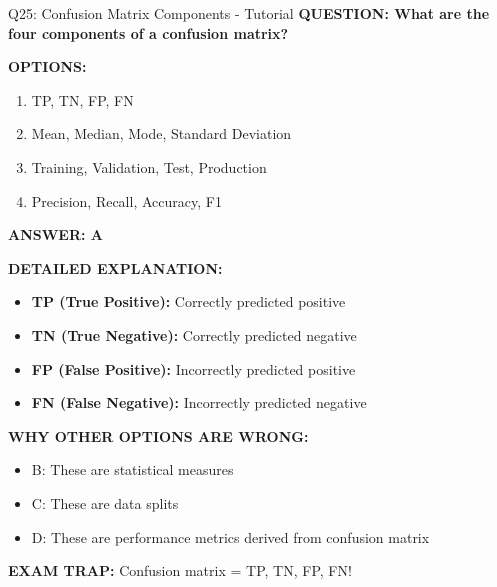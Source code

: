 \documentclass[8pt]{beamer}
\begin{document}
	\begin{frame}{Q25: Confusion Matrix Components - Tutorial}
		\fontsize{6.5}{7.5}\selectfont
		\textbf{QUESTION: What are the four components of a confusion matrix?}
		
		\vspace{0.1cm}
		\textbf{OPTIONS:}
		\begin{enumerate}
			\item TP, TN, FP, FN
			\item Mean, Median, Mode, Standard Deviation
			\item Training, Validation, Test, Production
			\item Precision, Recall, Accuracy, F1
		\end{enumerate}
		
		\vspace{0.1cm}
		\textcolor{myblue}{\textbf{ANSWER: A}}
		
		\vspace{0.1cm}
		\textbf{DETAILED EXPLANATION:}
		\begin{itemize}
			\item \textbf{TP (True Positive):} Correctly predicted positive
			\item \textbf{TN (True Negative):} Correctly predicted negative
			\item \textbf{FP (False Positive):} Incorrectly predicted positive
			\item \textbf{FN (False Negative):} Incorrectly predicted negative
		\end{itemize}
		
		\vspace{0.1cm}
		\textcolor{myred}{\textbf{WHY OTHER OPTIONS ARE WRONG:}}
		\begin{itemize}
			\item \textcolor{myred}{B:} These are statistical measures
			\item \textcolor{myred}{C:} These are data splits
			\item \textcolor{myred}{D:} These are performance metrics derived from confusion matrix
		\end{itemize}
		
		\textcolor{myred}{\textbf{EXAM TRAP:}} Confusion matrix = \textcolor{myblue}{TP, TN, FP, FN}!
	\end{frame}
	
\end{document}
